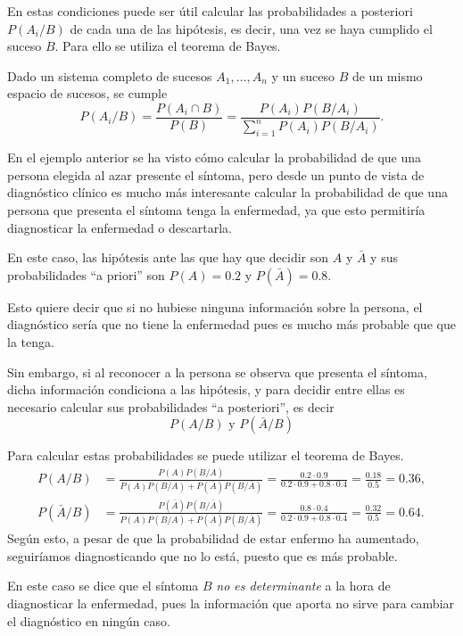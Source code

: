 En estas condiciones puede ser útil calcular las probabilidades a posteriori $P(A_i/B)$ de cada una de las hipótesis, es decir, una vez
se haya cumplido el suceso $B$. 
Para ello se utiliza el teorema de Bayes. 

\begin{teorema}[Bayes]
Dado un sistema completo de sucesos $A_1,\ldots,A_n$ y un suceso $B$ de un mismo espacio de sucesos, se cumple
\[
P(A_i/B) = \frac{P(A_i\cap B)}{P(B)} = \frac{P(A_i)P(B/A_i)}{\sum_{i=1}^n P(A_i)P(B/A_i)}.
\]
\end{teorema}

\begin{ejemplo}
En el ejemplo anterior se ha visto cómo calcular la probabilidad de que una persona elegida al azar presente el síntoma, pero desde un 
punto de vista de diagnóstico clínico es mucho más interesante calcular la probabilidad de que una persona que presenta el síntoma tenga la
enfermedad, ya que esto permitiría diagnosticar la enfermedad o descartarla. 

En este caso, las hipótesis ante las que hay que decidir son $A$ y $\bar A$ y sus probabilidades ``a priori'' son $P(A)=0.2$ y
$P(\bar A)=0.8$.

Esto quiere decir que si no hubiese ninguna información sobre la persona, el diagnóstico sería que no tiene la enfermedad pues es mucho más
probable que que la tenga.

Sin embargo, si al reconocer a la persona se observa que presenta el síntoma, dicha información condiciona a las hipótesis, y para decidir
entre ellas es necesario calcular sus probabilidades ``a posteriori'', es decir 
\[ P(A/B) \mbox{ y } P(\bar A/B)\]

Para calcular estas probabilidades se puede utilizar el teorema de Bayes.
\begin{align*}
P(A/B) &= \frac{P(A)P(B/A)}{P(A)P(B/A)+P(\bar A)P(B/\bar A)} = \frac{0.2\cdot 0.9}{0.2\cdot 0.9 + 0.8\cdot 0.4} =
\frac{0.18}{0.5}=0.36,\\
P(\bar A/B) &= \frac{P(\bar A)P(B/\bar A)}{P(A)P(B/A)+P(\bar A)P(B/\bar A)} = \frac{0.8\cdot 0.4}{0.2\cdot 0.9 +
0.8\cdot 0.4} = \frac{0.32}{0.5}=0.64.
\end{align*}
Según esto, a pesar de que la probabilidad de estar enfermo ha aumentado, seguiríamos diagnosticando que no lo está, puesto que es más
probable.

En este caso se dice que el síntoma $B$ \emph{no es determinante} a la hora de diagnosticar la enfermedad, pues la información que aporta no
sirve para cambiar el diagnóstico en ningún caso.
\end{ejemplo}


